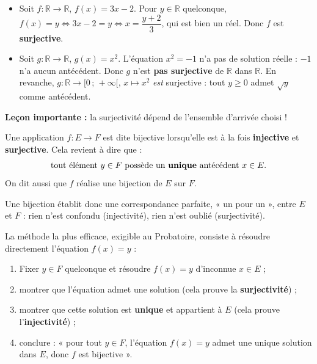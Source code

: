 \documentclass[11pt]{article}
\newcommand{\cle}[1]{{\popxbold\color{popdark}#1}}
\newcounter{popsec}
\newcounter{popsub}
\newcommand{\courssub}[1]{%
  \stepcounter{popsub}%
  \par\vspace{9pt}\noindent{\popxbold\fontsize{11.5}{13}\selectfont\color{popink}{\color{poporange}\thepopsec.\thepopsub}\hspace{6pt}#1}\par\nopagebreak\vspace{4pt}
}
\begin{document}
\begin{exemplebox}
\begin{itemize}
\item Soit $f : \mathbb{R} \to \mathbb{R}$, $f(x) = 3x - 2$. Pour $y \in \mathbb{R}$ quelconque, $f(x) = y \iff 3x - 2 = y \iff x = \dfrac{y+2}{3}$, qui est bien un réel. Donc $f$ est \textbf{surjective}.
\item Soit $g : \mathbb{R} \to \mathbb{R}$, $g(x) = x^2$. L'équation $x^2 = -1$ n'a pas de solution réelle : $-1$ n'a aucun antécédent. Donc $g$ n'est \textbf{pas surjective} de $\mathbb{R}$ dans $\mathbb{R}$. En revanche, $g : \mathbb{R} \to [0\,;\,+\infty[$, $x \mapsto x^2$ \emph{est} surjective : tout $y \geq 0$ admet $\sqrt{y}$ comme antécédent.
\end{itemize}
\textbf{Leçon importante :} la surjectivité dépend de l'ensemble d'arrivée choisi !
\end{exemplebox}

\courssub{Applications bijectives}

\begin{definition}
Une application $f : E \to F$ est dite \cle{bijective} lorsqu'elle est à la fois \textbf{injective} et \textbf{surjective}. Cela revient à dire que :
\[ \text{tout élément } y \in F \text{ possède un \textbf{unique} antécédent } x \in E. \]
On dit aussi que $f$ réalise une \cle{bijection} de $E$ sur $F$.
\end{definition}

Une bijection établit donc une correspondance parfaite, « un pour un », entre $E$ et $F$ : rien n'est confondu (injectivité), rien n'est oublié (surjectivité).

\begin{methode}
La méthode la plus efficace, exigible au Probatoire, consiste à résoudre directement l'équation $f(x) = y$ :
\begin{enumerate}
\item Fixer $y \in F$ quelconque et résoudre $f(x) = y$ d'inconnue $x \in E$ ;
\item montrer que l'équation admet une solution (cela prouve la \textbf{surjectivité}) ;
\item montrer que cette solution est \textbf{unique} et appartient à $E$ (cela prouve l'\textbf{injectivité}) ;
\item conclure : « pour tout $y \in F$, l'équation $f(x) = y$ admet une unique solution dans $E$, donc $f$ est bijective ».
\end{enumerate}
\end{methode}
\end{document}
